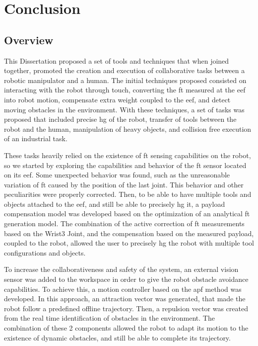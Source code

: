 \chapter{Conclusion}
\label{chp:7-tests}






\section{Overview}

\par This Dissertation proposed a set of tools and techniques that when joined together, promoted the creation and execution of collaborative tasks between a robotic manipulator and a human. The initial techniques proposed consisted on interacting with the robot through touch, converting the \ac{ft} measured at the \ac{eef} into robot motion, compensate extra weight coupled to the \ac{eef}, and detect moving obstacles in the environment. With these techniques, a set of tasks was proposed that included precise \ac{hg} of the robot, transfer of tools between the robot and the human, manipulation of heavy objects, and collision free execution of an industrial task.

\par These tasks  heavily relied on the existence of \ac{ft} sensing capabilities on the robot, so we started by exploring the capabilities and behavior of the \ac{ft} sensor located on its \ac{eef}. Some unexpected behavior was found, such as the unreasonable variation of \ac{ft} caused by the position of the last joint. This behavior and other peculiarities were properly corrected. Then, to be able to have multiple tools and objects attached to the \ac{eef}, and still be able to precisely \ac{hg} it, a payload compensation model was developed based on the optimization of an analytical \ac{ft} generation model. The combination of the active correction of \ac{ft} measurements based on the Wrist3 Joint, and the compensation based on the measured payload, coupled to the robot, allowed the user to precisely \ac{hg} the robot with multiple tool configurations and objects.

\par To increase the collaborativeness and safety of the system, an external vision sensor was added to the workspace in order to give the robot obstacle avoidance capabilities. To achieve this, a motion controller based on the \ac{apf} method was developed. In this approach, an attraction vector was generated, that made the robot follow a predefined offline trajectory. Then, a repulsion vector was created from the real time identification of obstacles in the environment. The combination of these 2 components allowed the robot to adapt its motion to the existence of dynamic obstacles, and still be able to complete its trajectory.

